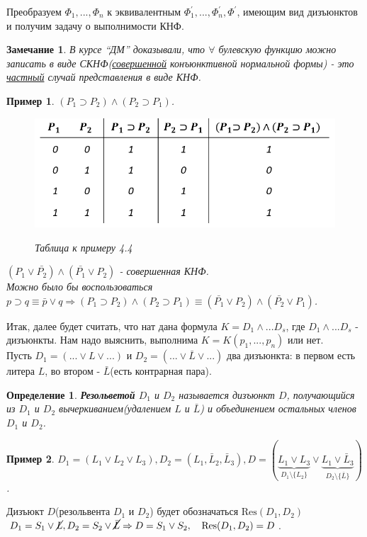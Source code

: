 \documentclass{article}
\newtheorem{example}{Пример}
\newtheorem{Remark}{Замечание}
\newtheorem{definition}{Определение}
\numberwithin{example}{section}
\numberwithin{question}{section}
\numberwithin{Remark}{section}
\numberwithin{theorem}{section}
\numberwithin{definition}{section}
\numberwithin{proposition}{section}
\begin{document}
Преобразуем $\Phi_1 ,...,\Phi_n$ к эквивалентным $\Phi_1^{'},...,\Phi_n^{'},\Phi^{'}$, имеющим вид дизъюнктов и получим задачу о выполнимости КНФ.
\begin{Remark}
	В курсе ``ДМ'' доказывали, что $\forall$ булевскую функцию можно записать в виде СКНФ(\underline{совершенной} конъюнктивной нормальной формы) - это \underline{частный} случай представления в виде КНФ.
\end{Remark}
\begin{example}
	$(P_1 \supset P_2)\land (P_2 \supset P_1)$.\\
	\begin{figure}[!htbp]
		\centering
		\includegraphics[width=0.5\linewidth]{4-4}
		\label{fig:4-4}
		\caption{Таблица к примеру 4.4}
	\end{figure}
	$(P_1 \lor \bar{P_2})\land (\bar{P_1}\lor P_2)$ - совершенная КНФ.\\
	Можно было бы воспользоваться $p\supset q\equiv \bar{p}\lor q \Rightarrow (P_1 \supset P_2)\land (P_2 \supset P_1)\equiv (\bar{P_1}\lor P_2)\land (\bar{P_2}\lor P_1)$.
\end{example}
Итак, далее будет считать, что нат дана формула $K=D_1 \land ... D_s$, где $D_1 \land ... D_s$ - дизъюнкты. Нам надо выяснить, выполнима $K=K(p_1 ,...,p_n)$ или нет.\\
Пусть $D_1 =(...\lor L \lor ...)$ и $D_2 =(... \lor \bar{L}\lor ...)$ два дизъюнкта: в первом есть литера $L$, во втором - $\bar{L}$(есть контрарная пара).
\begin{definition}
\textbf{Резольветой} $D_1$ и $D_2$ называется дизъюнкт $D$, получающийся из $D_1$ и $D_2$ вычеркиванием(удалением $L$ и $\bar{L}$) и объединением остальных членов $D_1$ и $D_2$.
\end{definition}
\begin{example}
	$D_1 =(L_1 \lor L_2 \lor L_3), D_2 =(L_1 , \bar{L}_2,\bar{L}_3), D=(\underbrace{L_1 \lor L_3}_{D_1 \setminus \{L_2\}}\lor \underbrace{L_1 \lor \bar{L}_3}_{D_2 \setminus \{\bar{L}\}})$.
\end{example}
Дизъюкт $D$(резольвента $D_1$ и $D_2$) будет обозначаться $\mathrm{Res}(D_1 ,D_2)$\\
$D_1 =S_1 \lor \cancel{L}, D_2 = S_2 \lor \cancel{\bar{L}}\Rightarrow D=S_1 \lor S_2,\quad\mathrm{Res}(D_1 ,D_2)=D$.\\
\end{document}
